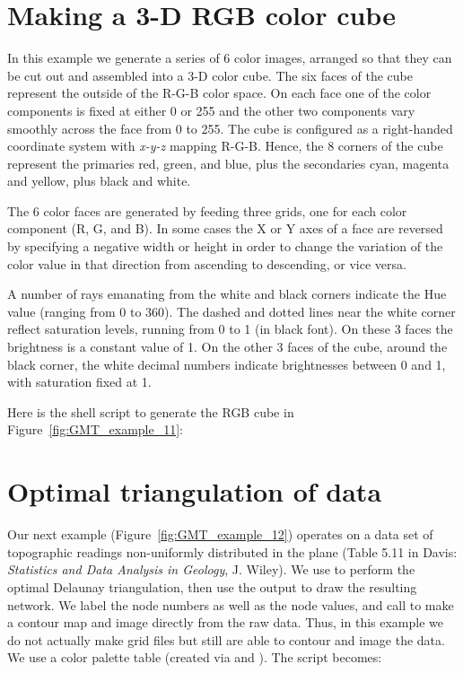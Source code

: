 

\section{Making a 3-D RGB color cube}

In this example we generate a series of 6 color images,
arranged so that they can be cut out
and assembled into a 3-D color cube.  The six faces of
the cube represent the outside of the R-G-B color space.
On each face one of the color components is fixed at either
0 or 255 and the other two components vary smoothly across
the face from 0 to 255.  The cube is configured as a
right-handed coordinate system with \emph{x-y-z} mapping
R-G-B.  Hence, the 8 corners of the cube represent the
primaries red, green, and blue, plus the secondaries cyan,
magenta and yellow, plus black and white.

The 6 color faces are generated by feeding  three grids, one for each color
component (R, G, and B). In some cases the X or Y axes of a face are reversed by specifying a
negative width or height in order to change the variation of the color value in that direction from
ascending to descending, or vice versa.

A number of rays emanating from the white and black corners indicate the Hue value (ranging from 0 to
360\DS). The dashed and dotted lines near the white corner reflect saturation levels, running from 0
to 1 (in black font). On these 3 faces the brightness is a constant value of 1.
On the other 3 faces of the cube, around the black corner, the white decimal numbers indicate
brightnesses between 0 and 1, with saturation fixed at 1.

Here is the shell script to generate the RGB cube in Figure~\ref{fig:GMT_example_11}:



\section{Optimal triangulation of data}
\label{sec:example_12}

Our next example (Figure~\ref{fig:GMT_example_12})
operates on a data set of topographic
readings non-uniformly distributed in the plane (Table
5.11 in Davis: {\it Statistics and Data Analysis in Geology},
J. Wiley).  We use  to perform the optimal
Delaunay triangulation, then use the output to draw the
resulting network.  We label the node numbers as well as
the node values, and call  to make a contour
map and image directly from the raw data.  Thus, in this
example we do not actually make grid files but still
are able to contour and image the data.  We use a color
palette table  (created via  and ).
The script becomes:

